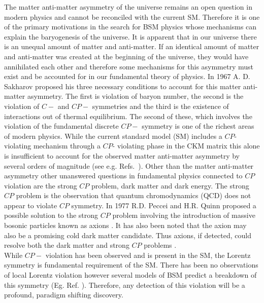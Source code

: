 \documentclass[10pt,a4paper, twoside, openright]{report}
\begin{document}
The matter anti-matter asymmetry of the universe remains an open question in modern physics and cannot be reconciled with the current SM. Therefore it is one of the primary motivations in the search for BSM physics whose mechanisms can explain the baryogenesis of the universe.  It is apparent that in our universe there is an unequal amount of matter and anti-matter. If an identical amount of matter and anti-matter was created at the beginning of the universe, they would have annihilated each other and therefore some mechanisms for this asymmetry must exist and be accounted for in our fundamental theory of physics. In 1967 A. D. Sakharov proposed his three necessary conditions to account for this matter anti-matter asymmetry. The first is violation of baryon number, the second is the violation of $C-$ and $CP-$ symmetries and the third is the existence of interactions out of thermal equilibrium. The second of these, which involves the violation of the fundamental discrete $CP-$ symmetry is one of the richest areas of modern physics. While the current standard model (SM)  includes a $CP$- violating mechanism through a $CP$- violating phase in the CKM matrix \cite{KM1973} this alone is insufficient to account for the observed matter anti-matter asymmetry by several orders of magnitude (see e.g. Refs.~\cite{Sakharov1967,Farrar1993, Huet1994, Pospelov2005, Canetti2012, FS2010}). Other than the matter anti-matter asymmetry other unanswered questions in fundamental physics connected to $CP$ violation are the strong $CP$ problem, dark matter and dark energy. The strong $CP$ problem is the observation that quantum chromodynamics (QCD) does not appear to violate $CP$ symmetry\cite{Peccei1977,Peccei1977D,Weinberg1976,Weinberg1978,Wilczek1978,Moody1984}. In 1977 R.D. Peccei and H.R. Quinn proposed a possible solution to the strong $CP$ problem involving the introduction of  massive bosonic particles known as axions \cite{Peccei1977,Peccei1977D}.  It has also been noted that the axion may also be a promising cold dark matter candidate. Thus axions, if detected, could resolve both the dark matter and strong $CP$ problems \cite{Kim2010,Baer2014,Kawasaki2013}. \\
\linebreak
While $CP-$ violation has been observed and is present in the SM, the Lorentz symmetry is fundamental requirement of the SM. There has been no observations of local Lorentz violation however several models of BSM predict a breakdown of this symmetry (Eg. Ref. \cite{Horava2009}). Therefore, any detection of this violation will be a profound, paradigm shifting discovery.\\ 
\end{document}
